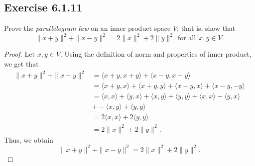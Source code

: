 \subsection*{Exercise 6.1.11} Prove the \textit{parallelogram law} on an inner product space \( V  \); that is, show that
\[  \|x + y \|^{2} + \|x - y \|^{2} = 2 \|x\|^{2} + 2 \|y\|^{2} \ \ \text{for all} \ \ x,y \in V. \]
\begin{proof}
Let \( x,y \in V  \). Using the definition of norm and properties of inner product, we get that
\begin{align*}
    \|x + y\|^{2} + \|x - y\|^{2} &= \langle x + y  ,  x + y  \rangle + \langle x -y  , x - y  \rangle \\
                                  &= \langle x + y  , x  \rangle + \langle x + y  , y \rangle + \langle x - y  , x  \rangle + \langle x - y  , -y  \rangle \\
                                  &= \langle x  , x \rangle + \langle y , x \rangle + \langle x  , y \rangle + \langle y  , y \rangle + \langle x  , x \rangle - \langle y , x \rangle \\
                                  &+ - \langle x , y \rangle + \langle y , y \rangle \\
                                  &= 2 \langle x , x \rangle + 2 \langle y , y \rangle \\
                                  &= 2 \|x\|^{2} + 2 \|y\|^{2}.
\end{align*}
Thus, we obtain
\[  \|x + y \|^{2} + \|x - y\|^{2} = 2 \|x\|^{2} + 2 \|y\|^{2}. \]
\end{proof}

